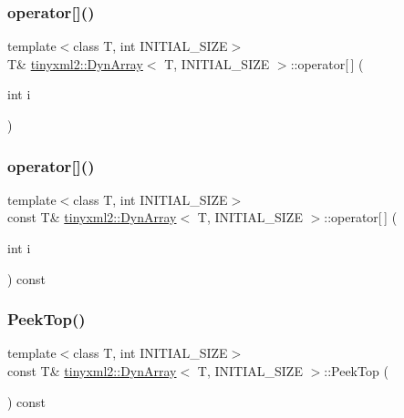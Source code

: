 \subsubsection{\texorpdfstring{operator[]()}{operator[]()}\hspace{0.1cm}{\footnotesize\ttfamily [1/2]}}
{\footnotesize\ttfamily template$<$class T, int I\+N\+I\+T\+I\+A\+L\+\_\+\+S\+I\+ZE$>$ \\
T\& \mbox{\hyperlink{classtinyxml2_1_1_dyn_array}{tinyxml2\+::\+Dyn\+Array}}$<$ T, I\+N\+I\+T\+I\+A\+L\+\_\+\+S\+I\+ZE $>$\+::operator\mbox{[}$\,$\mbox{]} (\begin{DoxyParamCaption}\item[{int}]{i }\end{DoxyParamCaption})\hspace{0.3cm}{\ttfamily [inline]}}

\mbox{\label{classtinyxml2_1_1_dyn_array_a474a5cd9bc97ea32b3dcef4c773125e1}} 
\subsubsection{\texorpdfstring{operator[]()}{operator[]()}\hspace{0.1cm}{\footnotesize\ttfamily [2/2]}}
{\footnotesize\ttfamily template$<$class T, int I\+N\+I\+T\+I\+A\+L\+\_\+\+S\+I\+ZE$>$ \\
const T\& \mbox{\hyperlink{classtinyxml2_1_1_dyn_array}{tinyxml2\+::\+Dyn\+Array}}$<$ T, I\+N\+I\+T\+I\+A\+L\+\_\+\+S\+I\+ZE $>$\+::operator\mbox{[}$\,$\mbox{]} (\begin{DoxyParamCaption}\item[{int}]{i }\end{DoxyParamCaption}) const\hspace{0.3cm}{\ttfamily [inline]}}

\mbox{\label{classtinyxml2_1_1_dyn_array_a5e4e1e408e646688503dec77c77c9d59}} 
\subsubsection{\texorpdfstring{Peek\+Top()}{PeekTop()}}
{\footnotesize\ttfamily template$<$class T, int I\+N\+I\+T\+I\+A\+L\+\_\+\+S\+I\+ZE$>$ \\
const T\& \mbox{\hyperlink{classtinyxml2_1_1_dyn_array}{tinyxml2\+::\+Dyn\+Array}}$<$ T, I\+N\+I\+T\+I\+A\+L\+\_\+\+S\+I\+ZE $>$\+::Peek\+Top (\begin{DoxyParamCaption}{ }\end{DoxyParamCaption}) const\hspace{0.3cm}{\ttfamily [inline]}}

